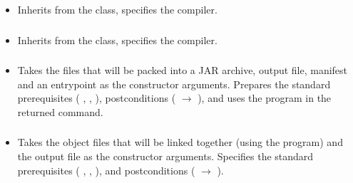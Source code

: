 \begin{itemize}[label={}]
    \item Inherits from the \hyperref[subsec:CompileBase]{} class, specifies the 
          compiler.
\end{itemize}

\subsubsection*{}\label{subsec:CompileJava}

\begin{itemize}[label={}]
    \item Inherits from the \hyperref[subsec:CompileBase]{} class, specifies the 
          compiler.
\end{itemize}

\subsubsection*{}\label{subsec:CreateJar}

\begin{itemize}[label={}]
    \item Takes the files that will be packed into a JAR archive, output file, manifest and an entrypoint as the
          constructor arguments.
          Prepares the standard prerequisites (
          \hyperref[subsec:ProgramExistsPrerequisite]{},
          \hyperref[subsec:FileExistsPrerequisite]{},
          \hyperref[subsec:NonEmptyListPrerequisite]{}
          ), postconditions (
          \hyperref[subsec:ExitCodePostcondition]{} $\rightarrow$ 
          ), and uses the  program in the returned command.
\end{itemize}

\subsubsection*{}\label{subsec:Link}

\begin{itemize}[label={}]
    \item Takes the object files that will be linked together (using the  program) and the output file as the
          constructor arguments.
          Specifies the standard prerequisites (
          \hyperref[subsec:ProgramExistsPrerequisite]{},
          \hyperref[subsec:FileExistsPrerequisite]{},
          \hyperref[subsec:NonEmptyListPrerequisite]{}
          ), and postconditions (
          \hyperref[subsec:ExitCodePostcondition]{} $\rightarrow$ 
          ).
\end{itemize}

